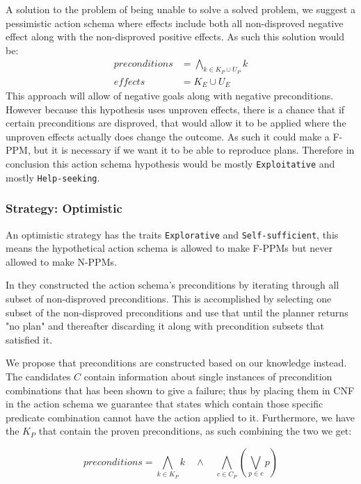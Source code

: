 \documentclass[../Master.tex]{subfiles}
\begin{document}
	A solution to the problem of being unable to solve a solved problem, we suggest a pessimistic action schema where effects include both all non-disproved negative effect along with the non-disproved positive effects.
	As such this solution would be:
		\begin{equation}
			\begin{split}			
				preconditions&= \bigwedge\limits_{k \in K_P \cup U_P} k \\
				effects&=  K_E \cup U_E
			\end{split}
		\end{equation}
	This approach will allow of negative goals along with negative preconditions. 
	However because this hypothesis uses unproven effects, there is a chance that if certain preconditions are disproved, that would allow it to be applied where the unproven effects actually does change the outcome.
	As such it could make a F-PPM, but it is necessary if we want it to be able to reproduce plans. 
	Therefore in conclusion this action schema hypothesis would be mostly \texttt{Exploitative} and mostly \texttt{Help-seeking}.
	
	

\subsubsection{Strategy: Optimistic} 

	An optimistic strategy has the traits \texttt{Explorative} and \texttt{Self-sufficient},
	this means the hypothetical action schema is allowed to make F-PPMs but never allowed to make N-PPMs.

	In \cite{Walsh2008} they constructed the action schema's preconditions by iterating through all subset of non-disproved preconditions.
	This is accomplished by selecting one subset of the non-disproved preconditions and use that until the planner returns "no plan" and thereafter discarding it along with precondition subsets that satisfied it.

	We propose that preconditions are constructed based on our knowledge instead.
	The candidates $C$ contain information about single instances of precondition combinations that has been shown to give a failure;
	thus by placing them in CNF in the action schema we guarantee that states which contain those specific predicate combination cannot have the action applied to it.
	Furthermore, we have the $K_P$ that contain the proven preconditions, as such combining the two we get:

	\begin{equation} \label{eq:nca:opt-preconds}
		preconditions = \bigwedge\limits_{k \in K_P} k \quad \land \quad  \bigwedge \limits_{c \in C_P} \left( \bigvee \limits_{p \in c} p\right)
	\end{equation}
\end{document}
